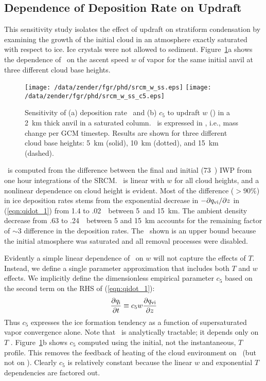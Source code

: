 \documentclass[twoside,agums]{aguplus}
\begin{document}
\subsection{Dependence of Deposition Rate on Updraft}

This sensitivity study isolates the effect of updraft on stratiform
condensation by examining the growth of the initial cloud in an
atmosphere exactly saturated with respect to ice. 
Ice crystals were not allowed to sediment.
Figure~\ref{fig:srcm_w_ss}a shows the dependence of \IWPdot\ on the
ascent speed $w$ of vapor for the same initial anvil at three
different cloud base heights.  
\begin{figure}
\begin{center}
\texttt{[image: /data/zender/fgr/phd/srcm\_w\_ss.eps]}\vfill
\texttt{[image: /data/zender/fgr/phd/srcm\_w\_ss\_c5.eps]}\vfill
\end{center}
\caption[Sensitivity of deposition rate \IWPdot\ and $c_5$ to updraft
$w$ in a 2~km thick anvil in a saturated column]{ 
Sensitivity of (a) deposition rate \IWPdot\ and (b) $c_5$ to updraft 
$w$ (\cmxs) in a 2~km thick anvil in a saturated column.
\IWPdot\ is expressed in \gxmSgcmt, i.e., mass change per GCM
timestep. 
Results are shown for three different cloud base heights: 5~km
(solid), 10~km (dotted), and 15~km (dashed).\label{fig:srcm_w_ss}} 
\end{figure}
\IWPdot\ is computed from the difference between the final and
initial (73~\gxmS) IWP from one hour integrations of the SRCM. 
\IWPdot\ is linear with $w$ for all cloud heights, and a nonlinear
dependence on cloud height is evident.
Most of the difference ($> 90\%$) in ice deposition rates stems
from the exponential decrease in $-\partial \mbox{$q_\mathrm{vi}$}/\partial z$ in
(\ref{eqn:qidot_1}) from 1.4 to .02~\gxkgkm\ between 5~and
15~km. 
The ambient density decrease from .63 to .24~\kgxmC\ between 5 and
15~km accounts for the remaining factor of $\sim 3$ difference in the
deposition rates. 
The \IWPdot\ shown is an upper bound because the initial atmosphere
was saturated and all removal processes were disabled. 

Evidently a simple linear dependence of \IWPdot\ on $w$ will not
capture the effects of $T$.
Instead, we define a single parameter approximation that includes both
$T$ and $w$ effects.
We implicitly define the dimensionless empirical parameter $c_5$ based
on the second term on the RHS of (\ref{eqn:qidot_1}):
\begin{equation}
{\partial \qi \over \partial t} \equiv 
c_5 w {\partial \qvi \over \partial z} 
\label{eqn:c5}
\end{equation}
Thus $c_5$ expresses the ice formation tendency as a function of
supersaturated vapor convergence alone.
Note that \dqvidz\ is analytically tractable; it depends only on $T$
\cite[e.g.,][]{WaP86}.  
Figure~\ref{fig:srcm_w_ss}b shows $c_5$ computed using the initial, not
the instantaneous, $T$ profile.
This removes the feedback of heating of the cloud environment on
\dqvidz\ (but not on \dqidt). 
Clearly $c_5$ is relatively constant because the linear $w$ and
exponential $T$ dependencies are factored out. 
\end{document}

